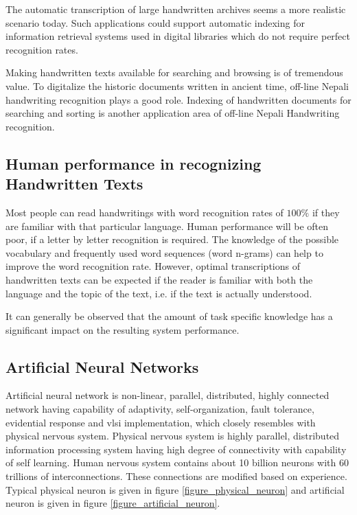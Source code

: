 The automatic transcription of large handwritten archives seems a more realistic scenario today. Such applications could support automatic indexing for information retrieval systems used in digital libraries which do not require perfect recognition rates.

Making handwritten texts available for searching and browsing is of tremendous value.
To digitalize the historic documents written in ancient time, off-line Nepali handwriting recognition plays a good role. Indexing of handwritten documents for searching and sorting is another application area of off-line Nepali Handwriting recognition.

\subsection{Human performance in recognizing Handwritten Texts}
Most people can read handwritings with word recognition rates of $100\%$ if they are familiar with that particular language. Human performance will be often poor, if a letter by letter recognition is required. The knowledge of the possible vocabulary and frequently used word sequences (word n-grams) can help to improve the word recognition rate. However, optimal transcriptions of handwritten texts can be expected if the reader is familiar with both the language and the topic of the text, i.e. if the text is actually understood.

It can generally be observed that the amount of task specific knowledge has a significant impact on the resulting system performance.

\subsection{Artificial Neural Networks}
Artificial neural network is non-linear, parallel, distributed, highly connected network having capability of adaptivity, self-organization, fault tolerance, evidential response and \ac{vlsi} implementation, which closely resembles with physical nervous system. Physical nervous system is highly parallel, distributed information processing system having high degree of connectivity with capability of self learning. Human nervous system contains about 10 billion neurons with 60 trillions of interconnections. These connections are modified based on experience. Typical physical neuron is given in figure \ref{figure_physical_neuron} and artificial neuron is given in figure \ref{figure_artificial_neuron}.

